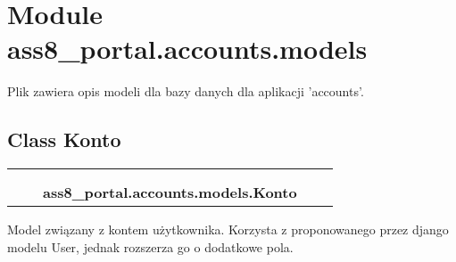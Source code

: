 %
%
%


\section{Module ass8\_portal.accounts.models}

    \label{ass8_portal:accounts:models}
Plik zawiera opis modeli dla bazy danych dla aplikacji 'accounts'.



\subsection{Class Konto}

    \label{ass8_portal:accounts:models:Konto}
\begin{tabular}{cccccc}
\multicolumn{2}{r}{\settowidth{\BCL}{django.db.models.Model}\multirow{2}{\BCL}{django.db.models.Model}}
&&
  \\\cline{3-3}
  &&\multicolumn{1}{c|}{}
&&
  \\
&&\multicolumn{2}{l}{\textbf{ass8\_portal.accounts.models.Konto}}
\end{tabular}

Model związany z kontem użytkownika. Korzysta z proponowanego przez django 
modelu User, jednak rozszerza go o dodatkowe pola.



